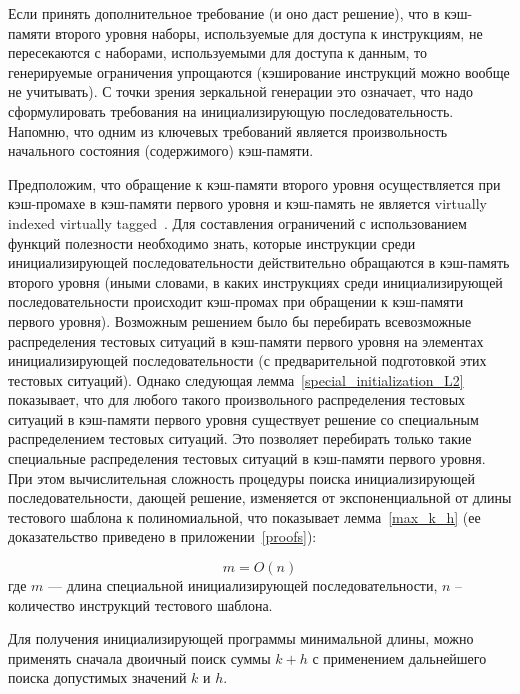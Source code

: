 Если принять дополнительное требование (и оно даст решение), что в
кэш-памяти второго уровня наборы, используемые для доступа к
инструкциям, не пересекаются с наборами, используемыми для доступа к
данным, то генерируемые ограничения упрощаются (кэширование
инструкций можно вообще не учитывать). С точки зрения зеркальной
генерации это означает, что надо сформулировать требования на
инициализирующую последовательность. Напомню, что одним из ключевых
требований является произвольность начального состояния
(содержимого) кэш-памяти.

Предположим, что обращение к кэш-памяти второго уровня
осуществляется при кэш-промахе в кэш-памяти первого уровня и
кэш-память не является virtually indexed virtually
tagged~\cite{HennessyPatterson3rd}. Для составления ограничений с
использованием функций полезности необходимо знать, которые
инструкции среди инициализирующей последовательности действительно
обращаются в кэш-память второго уровня (иными словами, в каких
инструкциях среди инициализирующей последовательности происходит
кэш-промах при обращении к кэш-памяти первого уровня). Возможным
решением было бы перебирать всевозможные распределения тестовых
ситуаций в кэш-памяти первого уровня на элементах инициализирующей
последовательности (с предварительной подготовкой этих тестовых
ситуаций). Однако следующая лемма~\ref{special_initialization_L2}
показывает, что для любого такого произвольного распределения
тестовых ситуаций в кэш-памяти первого уровня существует решение со
специальным распределением тестовых ситуаций. Это позволяет
перебирать только такие специальные распределения тестовых ситуаций
в кэш-памяти первого уровня. При этом вычислительная сложность
процедуры поиска инициализирующей последовательности, дающей
решение, изменяется от экспоненциальной от длины тестового шаблона к
полиномиальной, что показывает лемма~\ref{max_k_h} (ее доказательство
приведено в приложении~\ref{proofs}):
\begin{lemma}\label{max_k_h} \MaxUpperBoundLRU
\end{lemma}
\begin{sld}
$$m = O(n)$$ где $m$ --- длина специальной инициализирующей
последовательности, $n$ -- количество инструкций тестового шаблона.
\end{sld}

Для получения инициализирующей программы минимальной длины, можно
применять сначала двоичный поиск суммы $k+h$ с применением
дальнейшего поиска допустимых значений $k$ и $h$.

